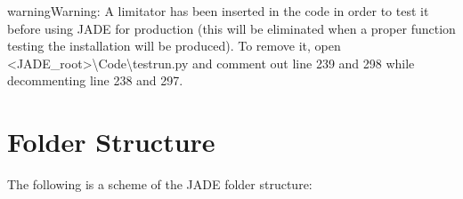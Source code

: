 \documentclass[letterpaper,10pt,english]{sphinxmanual}
\begin{document}
\begin{sphinxadmonition}{warning}{Warning:}
A limitator has been inserted in the code in order to test it before using JADE for production
(this will be eliminated when a proper function testing the installation will be produced).
To remove it, open \textless{}JADE\_root\textgreater{}\textbackslash{}Code\textbackslash{}testrun.py and comment out line 239 and 298 while de\sphinxhyphen{}commenting line 238 and 297.
\end{sphinxadmonition}


\chapter{Folder Structure}
\label{\detokenize{usage/folders:folder-structure}}\label{\detokenize{usage/folders:folders}}\label{\detokenize{usage/folders::doc}}
The following is a scheme of the JADE folder structure:
\end{document}
